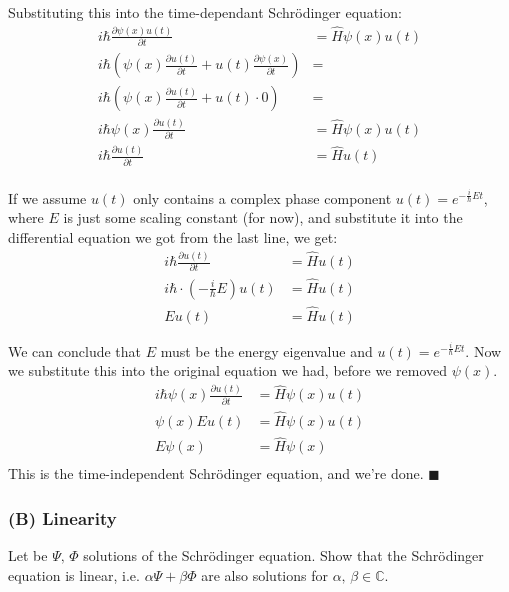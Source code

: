 \documentclass{article}
\newcommand{\C}{\mathbb{C}}
\begin{document}
  Substituting this into the time-dependant Schrödinger equation:
  \begin{align*}
    i\hbar \frac{\partial \psi(x) u(t)}{\partial t} &= \hat{H} \psi(x) u(t) \\
    i\hbar \left( \psi(x)\frac{\partial u(t)}{\partial t} + u(t)\frac{\partial \psi(x)}{\partial t} \right) &= \\
    i\hbar \left( \psi(x)\frac{\partial u(t)}{\partial t} + u(t) \cdot 0 \right) &= \\
    i\hbar \psi(x)\frac{\partial u(t)}{\partial t} &= \hat{H} \psi(x) u(t) \\
    i\hbar \frac{\partial u(t)}{\partial t} &= \hat{H} u(t) \\
  \end{align*}

  If we assume $u(t)$ only contains a complex phase component $u(t) = e^{-\frac{i}{\hbar}Et}$,
  where $E$ is just some scaling constant (for now),
  and substitute it into the differential equation we got from the last line, we get:
  \begin{align*}
    i\hbar \frac{\partial u(t)}{\partial t} &= \hat{H} u(t) \\
    i\hbar \cdot \left( {-\frac{i}{\hbar}E} \right) u(t) &= \hat{H} u(t) \\
    E u(t) &= \hat{H} u(t)
  \end{align*}

  We can conclude that $E$ must be the energy eigenvalue and $u(t) = e^{-\frac{i}{\hbar}Et}$.
  Now we substitute this into the original equation we had, before we removed $\psi(x)$.
  \begin{align*}
    i\hbar \psi(x)\frac{\partial u(t)}{\partial t} &= \hat{H} \psi(x) u(t) \\
    \psi(x) E u(t) &= \hat{H} \psi(x) u(t) \\
    E\psi(x) &= \hat{H} \psi(x) \\
  \end{align*}
  This is the time-independent Schrödinger equation, and we're done.
  $\blacksquare$

  \subsubsection*{(B) Linearity}
  \begin{centerframebox}
    Let be $\Psi,\, \Phi$  solutions of the Schrödinger equation.
    Show that the Schrödinger equation is linear, i.e. $\alpha\Psi + \beta\Phi$ are also solutions for $\alpha,\, \beta \in \C$.
  \end{centerframebox}
\end{document}
